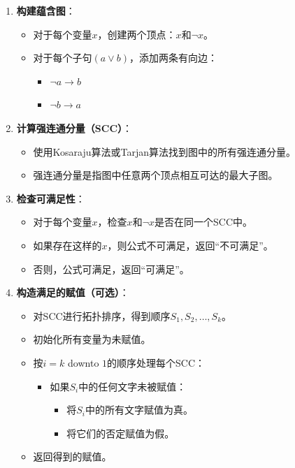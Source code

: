 \documentclass[./../main.tex]{subfiles}
\begin{document}
\begin{enumerate}
    \item \textbf{构建蕴含图}：
    \begin{itemize}
        \item 对于每个变量$x$，创建两个顶点：$x$和$\neg x$。
        \item 对于每个子句$(a \lor b)$，添加两条有向边：
        \begin{itemize}
            \item $\neg a \rightarrow b$
            \item $\neg b \rightarrow a$
        \end{itemize}
    \end{itemize}

    \item \textbf{计算强连通分量（SCC）}：
    \begin{itemize}
        \item 使用Kosaraju算法或Tarjan算法找到图中的所有强连通分量。
        \item 强连通分量是指图中任意两个顶点相互可达的最大子图。
    \end{itemize}

    \item \textbf{检查可满足性}：
    \begin{itemize}
        \item 对于每个变量$x$，检查$x$和$\neg x$是否在同一个SCC中。
        \item 如果存在这样的$x$，则公式不可满足，返回“不可满足”。
        \item 否则，公式可满足，返回“可满足”。
    \end{itemize}

    \item \textbf{构造满足的赋值（可选）}：
    \begin{itemize}
        \item 对SCC进行拓扑排序，得到顺序$S_1, S_2, \ldots, S_k$。
        \item 初始化所有变量为未赋值。
        \item 按$i = k$ downto $1$的顺序处理每个SCC：
        \begin{itemize}
            \item 如果$S_i$中的任何文字未被赋值：
            \begin{itemize}
                \item 将$S_i$中的所有文字赋值为真。
                \item 将它们的否定赋值为假。
            \end{itemize}
        \end{itemize}
        \item 返回得到的赋值。
    \end{itemize}
\end{enumerate}
\end{document}
